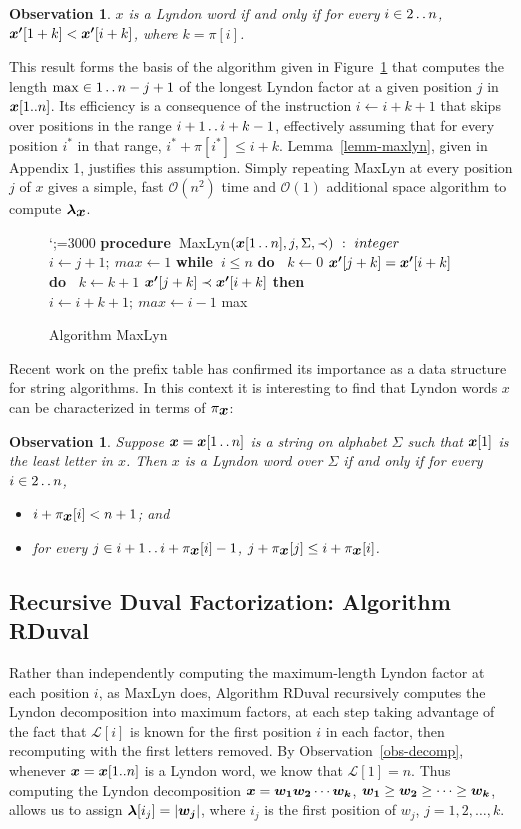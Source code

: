 \documentclass[10pt]{llncs}
\newtheorem{obs}[thrm]{Observation}
\def\dd{\mathinner{\ldotp\ldotp}}
\def\s#1{\mbox{\boldmath $#1$}}
\def\+{\!+\!}
\def\bproc{{\bf procedure\ }}
\def\bwhile{{\bf while\ }}
\def\bdo{{\bf do\ }}
\def\bif{{\bf if\ }}
\def\bthen{{\bf then\ }}
\def\belse{{\bf else\ }}
\def\breturn{{\bf return\ }}
\def\la{\leftarrow}
\def\q{\quad}
\def\qq{\qquad}
\def\L{\mathcal{L}}
\begin{document}
\begin{obs}
\label{obs2}
\s{x} is a Lyndon word if and only if for every $i \in 2\dd n$,
$\s{x'}[1+k] < \s{x'}[i+k]$, where $k = \pi[i]$.
\end{obs}
This result forms the basis of the algorithm
given in Figure~\ref{fig-maxlyn} that computes
the length $\max \in 1\dd n-j +1$
of the longest Lyndon factor at a given position $j$ in $\s{x}[1..n]$.
Its efficiency is a consequence of the instruction
$i \la i+k+1$ that skips over positions in the range $i+1\dd i+k-1$,
effectively assuming that for every position $i^*$
in that range, $i^*+\pi[i^*] \le i\+ k$.
Lemma~\ref{lemm-maxlyn}, given in Appendix 1, justifies this assumption.
Simply repeating MaxLyn at every position $j$ of \s{x}
gives a simple, fast $\mathcal{O}(n^2)$ time and $\mathcal{O}(1)$ additional space
algorithm to compute $\s{\lambda}_{\s{x}}$.

\begin{figure}[ht]
{\leftskip=2.5cm\obeylines\sfcode`;=3000
\bproc MaxLyn$(\s{x}[1\dd n],j,\Sigma,\prec)\ :\ integer$
$i \la j + 1;\ max\la 1$
\bwhile $i \le n$ \bdo
\q $k \la 0$
\q \bwhile $\s{x'}[j+k] = \s{x'}[i+k]$ \bdo
\qq $k \la k+1$
\q \bif $\s{x'}[j+k] \prec \s{x'}[i+k]$ \bthen
\qq $i \la i+k+1;\ max \la i-1$
\q \belse
\qq \breturn max
}
\caption{Algorithm MaxLyn}
\label{fig-maxlyn}
\end{figure}
Recent work on the prefix table
\cite{BKS13,CRSW15} has confirmed its importance as a data structure
for string algorithms.
In this context it is interesting to find that Lyndon words \s{x}
can be characterized in terms of $\pi_{\s{x}}$:
\begin{obs}
\label{obs-prefix}
Suppose $\s{x} = \s{x}[1\dd n]$ is a string on alphabet $\Sigma$
such that $\s{x}[1]$ is the least letter in \s{x}.
Then \s{x} is a Lyndon word over $\Sigma$ if and only if
for every $i \in 2\dd n$,
\begin{itemize}
\item[$(a)$]
$i + \pi_{\s{x}}[i] < n+1$; and
\item[$(b)$]
for every $j \in i+1\dd i+\pi_{\s{x}}[i]-1$,
$j + \pi_{\s{x}}[j] \le i + \pi_{\s{x}}[i]$.
\end{itemize}
\end{obs}

\subsection{Recursive Duval Factorization: Algorithm RDuval}
Rather than independently computing the maximum-length Lyndon factor
at each position $i$, as MaxLyn does, Algorithm RDuval
recursively computes the Lyndon decomposition into
maximum factors, at each step taking advantage of the fact that
$\L[i]$ is known for the first position $i$ in each factor,
then recomputing with the first letters removed.
By Observation~\ref{obs-decomp},
whenever $\s{x} = \s{x}[1..n]$ is a Lyndon word,
we know that $\L[1] = n$.
Thus computing the Lyndon decomposition $\s{x} = \s{w_1w_2}\cdots\s{w_k}$,
$\s{w_1} \ge \s{w_2} \ge \cdots \ge \s{w_k}$,
allows us to assign $\s{\lambda}[i_j] = |\s{w_j}|$,
where $i_j$ is the first position of \s{w_j}, $j = 1,2,\ldots,k$.
\end{document}
